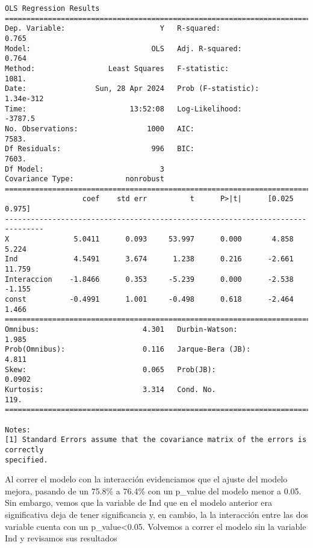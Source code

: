 \documentclass[11pt]{article}
\begin{document}
    \begin{Verbatim}[commandchars=\\\{\}]
                            OLS Regression Results
==============================================================================
Dep. Variable:                      Y   R-squared:                       0.765
Model:                            OLS   Adj. R-squared:                  0.764
Method:                 Least Squares   F-statistic:                     1081.
Date:                Sun, 28 Apr 2024   Prob (F-statistic):          1.34e-312
Time:                        13:52:08   Log-Likelihood:                -3787.5
No. Observations:                1000   AIC:                             7583.
Df Residuals:                     996   BIC:                             7603.
Df Model:                           3
Covariance Type:            nonrobust
===============================================================================
                  coef    std err          t      P>|t|      [0.025      0.975]
-------------------------------------------------------------------------------
X               5.0411      0.093     53.997      0.000       4.858       5.224
Ind             4.5491      3.674      1.238      0.216      -2.661      11.759
Interaccion    -1.8466      0.353     -5.239      0.000      -2.538      -1.155
const          -0.4991      1.001     -0.498      0.618      -2.464       1.466
==============================================================================
Omnibus:                        4.301   Durbin-Watson:                   1.985
Prob(Omnibus):                  0.116   Jarque-Bera (JB):                4.811
Skew:                           0.065   Prob(JB):                       0.0902
Kurtosis:                       3.314   Cond. No.                         119.
==============================================================================

Notes:
[1] Standard Errors assume that the covariance matrix of the errors is correctly
specified.
    \end{Verbatim}

    Al correr el modelo con la interacción evidenciamos que el ajuste del
modelo mejora, pasando de un 75.8\% a 76.4\% con un p\_value del modelo
menor a 0.05. Sin embargo, vemos que la variable de Ind que en el modelo
anterior era significativa deja de tener significancia y, en cambio, la
la interacción entre las dos variable cuenta con un
p\_value\textless0.05. Volvemos a correr el modelo sin la variable Ind y
revisamos sus resultados
\end{document}
